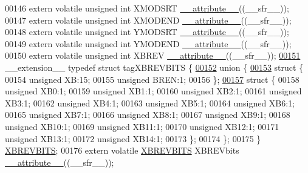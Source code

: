 \begin{DoxyCode}
00146 \textcolor{keyword}{extern} \textcolor{keyword}{volatile} \textcolor{keywordtype}{unsigned} \textcolor{keywordtype}{int}  XMODSRT \hyperlink{a00015_a493c46f03454991ccc5aa7a6e1dfb2a7}{\_\_attribute\_\_}((\_\_sfr\_\_));
00147 \textcolor{keyword}{extern} \textcolor{keyword}{volatile} \textcolor{keywordtype}{unsigned} \textcolor{keywordtype}{int}  XMODEND \hyperlink{a00015_a493c46f03454991ccc5aa7a6e1dfb2a7}{\_\_attribute\_\_}((\_\_sfr\_\_));
00148 \textcolor{keyword}{extern} \textcolor{keyword}{volatile} \textcolor{keywordtype}{unsigned} \textcolor{keywordtype}{int}  YMODSRT \hyperlink{a00015_a493c46f03454991ccc5aa7a6e1dfb2a7}{\_\_attribute\_\_}((\_\_sfr\_\_));
00149 \textcolor{keyword}{extern} \textcolor{keyword}{volatile} \textcolor{keywordtype}{unsigned} \textcolor{keywordtype}{int}  YMODEND \hyperlink{a00015_a493c46f03454991ccc5aa7a6e1dfb2a7}{\_\_attribute\_\_}((\_\_sfr\_\_));
00150 \textcolor{keyword}{extern} \textcolor{keyword}{volatile} \textcolor{keywordtype}{unsigned} \textcolor{keywordtype}{int}  XBREV \hyperlink{a00015_a493c46f03454991ccc5aa7a6e1dfb2a7}{\_\_attribute\_\_}((\_\_sfr\_\_));
\hypertarget{a00015_source_l00151}{}\hyperlink{a00014}{00151} \_\_extension\_\_ \textcolor{keyword}{typedef} \textcolor{keyword}{struct }tagXBREVBITS \{
\hypertarget{a00015_source_l00152}{}\hyperlink{a00015}{00152}   \textcolor{keyword}{union }\{
\hypertarget{a00015_source_l00153}{}\hyperlink{a00015}{00153}     \textcolor{keyword}{struct }\{
00154       \textcolor{keywordtype}{unsigned} XB:15;
00155       \textcolor{keywordtype}{unsigned} BREN:1;
00156     \};
\hypertarget{a00015_source_l00157}{}\hyperlink{a00015}{00157}     \textcolor{keyword}{struct }\{
00158       \textcolor{keywordtype}{unsigned} XB0:1;
00159       \textcolor{keywordtype}{unsigned} XB1:1;
00160       \textcolor{keywordtype}{unsigned} XB2:1;
00161       \textcolor{keywordtype}{unsigned} XB3:1;
00162       \textcolor{keywordtype}{unsigned} XB4:1;
00163       \textcolor{keywordtype}{unsigned} XB5:1;
00164       \textcolor{keywordtype}{unsigned} XB6:1;
00165       \textcolor{keywordtype}{unsigned} XB7:1;
00166       \textcolor{keywordtype}{unsigned} XB8:1;
00167       \textcolor{keywordtype}{unsigned} XB9:1;
00168       \textcolor{keywordtype}{unsigned} XB10:1;
00169       \textcolor{keywordtype}{unsigned} XB11:1;
00170       \textcolor{keywordtype}{unsigned} XB12:1;
00171       \textcolor{keywordtype}{unsigned} XB13:1;
00172       \textcolor{keywordtype}{unsigned} XB14:1;
00173     \};
00174   \};
00175 \} \hyperlink{a00014_dc/d17/a00872}{XBREVBITS};
00176 \textcolor{keyword}{extern} \textcolor{keyword}{volatile} \hyperlink{a00014_dc/d17/a00872}{XBREVBITS} XBREVbits \hyperlink{a00015_a493c46f03454991ccc5aa7a6e1dfb2a7}{\_\_attribute\_\_}((\_\_sfr\_\_));

\end{DoxyCode}
